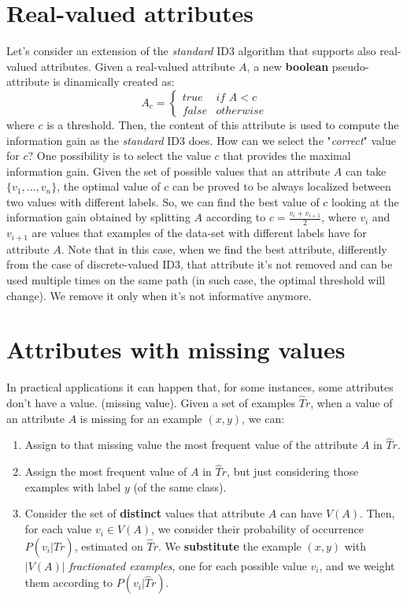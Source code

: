 \section{Real-valued attributes}
Let's consider an extension of the \textit{standard} ID3 algorithm that supports also real-valued attributes.\newline\newline
Given a real-valued attribute $A$, a new \textbf{boolean} pseudo-attribute is dinamically created as:
\[A_{c} = \begin{cases}
            true & if \, \, A < c \\
            false & otherwise
          \end{cases}\]
where $c$ is a threshold.\newline\newline
Then, the content of this attribute is used to compute the information gain as the \textit{standard} ID3 does. How can we select the "\textit{correct}" value for $c$? One possibility is to select the value $c$ that provides the maximal information gain. Given the set of possible values that an attribute $A$ can take $\{v_{1},...,v_{n}\}$, the optimal value of $c$ can be proved to be always localized between two values with different labels. So, we can find the best value of $c$ looking at the information gain obtained by splitting $A$ according to $c = \frac{v_{i} + v_{i+1}}{2}$, where $v_{i}$ and $v_{i+1}$ are values that examples of the data-set with different labels have for attribute $A$.\newline\newline
Note that in this case, when we find the best attribute, differently from the case of discrete-valued ID3, that attribute it's not removed and can be used multiple times on the same path (in such case, the optimal threshold will change). We remove it only when it's not informative anymore.
\section{Attributes with missing values}
In practical applications it can happen that, for some instances, some attributes don't have a value. (missing value).\newline\newline
Given a set of examples $\hat{T}r$, when a value of an attribute $A$ is missing for an example $(x,y)$, we can:
\begin{enumerate}
    \item Assign to that missing value the most frequent value of the attribute $A$ in $\hat{T}r$.
    \item Assign the most frequent value of $A$ in $\hat{T}r$, but just considering those examples with label $y$ (of the same class).
    \item Consider the set of \textbf{distinct} values that attribute $A$ can have $V(A)$. Then, for each value $v_{i} \in V(A)$, we consider their probability of occurrence $P(v_{i}|\hat{T}r)$, estimated on $\hat{T}r$. We \textbf{substitute} the example $(x,y)$ with $|V(A)|$ \textit{fractionated examples}, one for each possible value $v_{i}$, and we weight them according to $P(v_{i}|\hat{T}r)$.
\end{enumerate}
